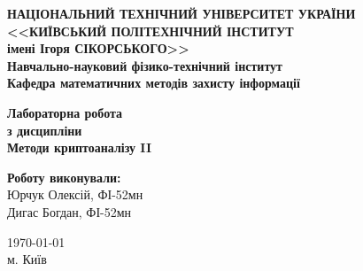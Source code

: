 \thispagestyle{empty}
\linespread{1.1}

\begin{center}
    {\bfseries\large
        НАЦІОНАЛЬНИЙ ТЕХНІЧНИЙ УНІВЕРСИТЕТ УКРАЇНИ \\
        <<КИЇВСЬКИЙ ПОЛІТЕХНІЧНИЙ ІНСТИТУТ \\
        імені Ігоря СІКОРСЬКОГО>> \\
        Навчально-науковий фізико-технічний інститут \\
        \medskip
        Кафедра математичних методів захисту інформації}
\end{center}

\begin{center}
\vspace{40mm}
{\bfseries\huge Лабораторна робота } \\
{\bfseries\huge з дисципліни} \\
{\bfseries\huge Методи криптоаналізу II} \\
\end{center}

\vspace{55mm}
\begin{center}
    \hfill
    \begin{minipage}[t]{0.4\textwidth}
        \begin{flushright}
            \textbf{Роботу виконували:} \\
            Юрчук Олексій, ФІ-52мн \\
            Дигас Богдан, ФІ-52мн
        \end{flushright}
    \end{minipage}
\end{center}

\vfill
\begin{center}
    \today \\
    {м. Київ}
\end{center}

\newpage
{}
